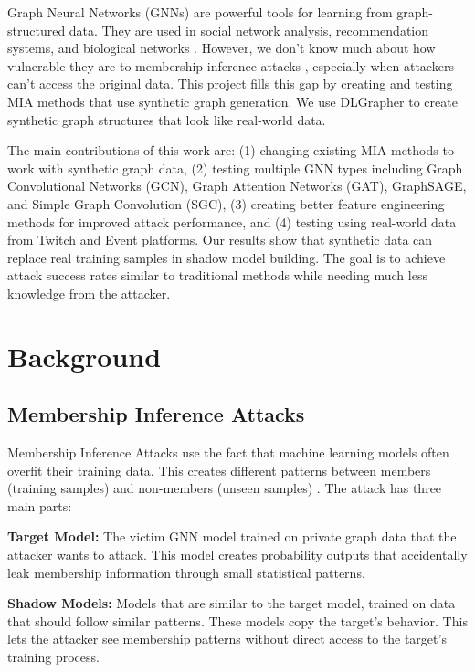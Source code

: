 \documentclass{article}
\begin{document}
Graph Neural Networks (GNNs) are powerful tools for learning from graph-structured data. They are used in social network analysis, recommendation systems, and biological networks \cite{kipf2017semi, velickovic2018graph, hamilton2017inductive}. However, we don't know much about how vulnerable they are to membership inference attacks \cite{he2021membership}, especially when attackers can't access the original data. This project fills this gap by creating and testing MIA methods that use synthetic graph generation. We use DLGrapher \cite{dlgrapher2022} to create synthetic graph structures that look like real-world data.

The main contributions of this work are: (1) changing existing MIA methods to work with synthetic graph data, (2) testing multiple GNN types including Graph Convolutional Networks (GCN), Graph Attention Networks (GAT), GraphSAGE, and Simple Graph Convolution (SGC), (3) creating better feature engineering methods for improved attack performance, and (4) testing using real-world data from Twitch and Event platforms. Our results show that synthetic data can replace real training samples in shadow model building. The goal is to achieve attack success rates similar to traditional methods while needing much less knowledge from the attacker.

\section{Background}
\subsection{Membership Inference Attacks}
Membership Inference Attacks use the fact that machine learning models often overfit their training data. This creates different patterns between members (training samples) and non-members (unseen samples) \cite{salem2019ml, nasr2019comprehensive}. The attack has three main parts:

\textbf{Target Model:} The victim GNN model trained on private graph data that the attacker wants to attack. This model creates probability outputs that accidentally leak membership information through small statistical patterns.

\textbf{Shadow Models:} Models that are similar to the target model, trained on data that should follow similar patterns. These models copy the target's behavior. This lets the attacker see membership patterns without direct access to the target's training process.
\end{document}
